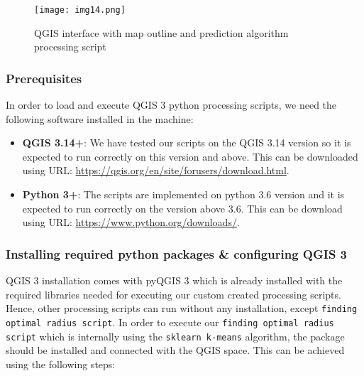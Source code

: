 \begin{figure}[H]
\centering
\texttt{[image: img14.png]}
\caption{QGIS interface with map outline and prediction algorithm processing script}
\label{fig:img14}
\end{figure}

\subsubsection{Prerequisites}

In order to load and execute QGIS 3 python processing scripts, we need the following software installed in the machine:
\begin{itemize}
    \item \textbf{QGIS 3.14+}: We have tested our scripts on the QGIS 3.14 version so it is expected to run correctly on this version and above. This can be downloaded using URL: \url{https://qgis.org/en/site/forusers/download.html}.
    \item \textbf{Python 3+}: The scripts are implemented on python 3.6 version and it is expected to run correctly on the version above 3.6. This can be download using URL: \url{https://www.python.org/downloads/}.
\end{itemize}

\subsubsection{Installing required python packages \& configuring QGIS 3}

QGIS 3 installation comes with pyQGIS 3 which is already installed with the required libraries needed for executing our custom created processing scripts. Hence, other processing scripts can run without any installation, except \texttt{finding optimal radius script}. In order to execute our \texttt{finding optimal radius script} which is internally using the \texttt{sklearn k-means} algorithm, the package should be installed and connected with the QGIS space. This can be achieved using the following steps:


